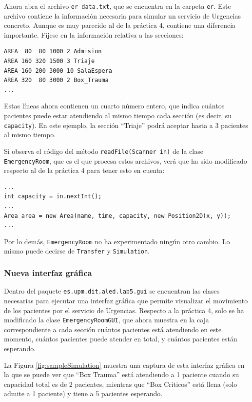 \documentclass[10pt,a4paper,spanish]{article}
\newcommand{\code}[1]{\texttt{#1}}
\begin{document}
Ahora abra el archivo \code{er\_data.txt}, que se encuentra en la carpeta \code{er}. Este archivo contiene la información necesaria para simular un servicio de Urgencias concreto. Aunque es muy parecido al de la práctica 4, contiene una diferencia importante. Fíjese en la información relativa a las secciones:

\begin{verbatim}
AREA  80  80 1000 2 Admision
AREA 160 320 1500 3 Triaje
AREA 160 200 3000 10 SalaEspera
AREA 320  80 3000 2 Box_Trauma
...
\end{verbatim}

Estas líneas ahora contienen un cuarto número entero, que indica cuántos pacientes puede estar atendiendo al mismo tiempo cada sección (es decir, su \code{capacity}). En este ejemplo, la sección ``Triaje'' podrá aceptar hasta a 3 pacientes al mismo tiempo.

Si observa el código del método \code{readFile(Scanner in)} de la clase \code{EmergencyRoom}, que es el que procesa estos archivos, verá que ha sido modificado respecto al de la práctica 4 para tener esto en cuenta:

\begin{verbatim}
...
int capacity = in.nextInt();
...
Area area = new Area(name, time, capacity, new Position2D(x, y));
...				
\end{verbatim}

Por lo demás, \code{EmergencyRoom} no ha experimentado ningún otro cambio. Lo mismo puede decirse de \code{Transfer} y \code{Simulation}.

\subsubsection{Nueva interfaz gráfica}

Dentro del paquete \code{es.upm.dit.aled.lab5.gui} se encuentran las clases necesarias para ejecutar una interfaz gráfica que permite visualizar el movimiento de los pacientes por el servicio de Urgencias. Respecto a la práctica 4, solo se ha modificado la clase \code{EmergencyRoomGUI}, que ahora muestra en la caja correspondiente a cada sección cuántos pacientes está atendiendo en este momento, cuántos pacientes puede atender en total, y cuántos pacientes están esperando.

La Figura \ref{fig:sampleSimulation} muestra una captura de esta interfaz gráfica en la que se puede ver que ``Box Trauma'' está atendiendo a 1 paciente cuando su capacidad total es de 2 pacientes, mientras que ``Box Criticos'' está llena (solo admite a 1 paciente) y tiene a 5 pacientes esperando.
\end{document}
